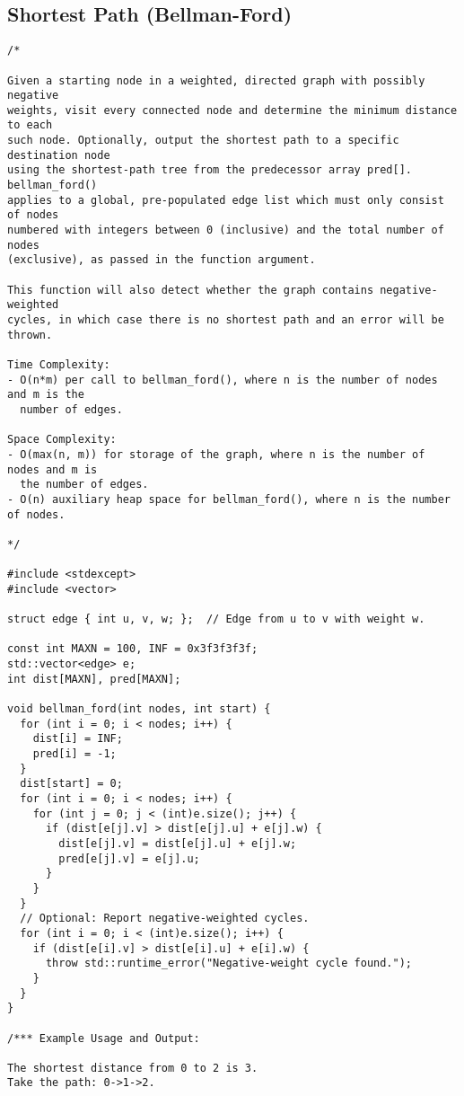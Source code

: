 \subsection{Shortest Path (Bellman-Ford)}
\begin{lstlisting}
/*

Given a starting node in a weighted, directed graph with possibly negative
weights, visit every connected node and determine the minimum distance to each
such node. Optionally, output the shortest path to a specific destination node
using the shortest-path tree from the predecessor array pred[]. bellman_ford()
applies to a global, pre-populated edge list which must only consist of nodes
numbered with integers between 0 (inclusive) and the total number of nodes
(exclusive), as passed in the function argument.

This function will also detect whether the graph contains negative-weighted
cycles, in which case there is no shortest path and an error will be thrown.

Time Complexity:
- O(n*m) per call to bellman_ford(), where n is the number of nodes and m is the
  number of edges.

Space Complexity:
- O(max(n, m)) for storage of the graph, where n is the number of nodes and m is
  the number of edges.
- O(n) auxiliary heap space for bellman_ford(), where n is the number of nodes.

*/

#include <stdexcept>
#include <vector>

struct edge { int u, v, w; };  // Edge from u to v with weight w.

const int MAXN = 100, INF = 0x3f3f3f3f;
std::vector<edge> e;
int dist[MAXN], pred[MAXN];

void bellman_ford(int nodes, int start) {
  for (int i = 0; i < nodes; i++) {
    dist[i] = INF;
    pred[i] = -1;
  }
  dist[start] = 0;
  for (int i = 0; i < nodes; i++) {
    for (int j = 0; j < (int)e.size(); j++) {
      if (dist[e[j].v] > dist[e[j].u] + e[j].w) {
        dist[e[j].v] = dist[e[j].u] + e[j].w;
        pred[e[j].v] = e[j].u;
      }
    }
  }
  // Optional: Report negative-weighted cycles.
  for (int i = 0; i < (int)e.size(); i++) {
    if (dist[e[i].v] > dist[e[i].u] + e[i].w) {
      throw std::runtime_error("Negative-weight cycle found.");
    }
  }
}

/*** Example Usage and Output:

The shortest distance from 0 to 2 is 3.
Take the path: 0->1->2.


\end{lstlisting}

